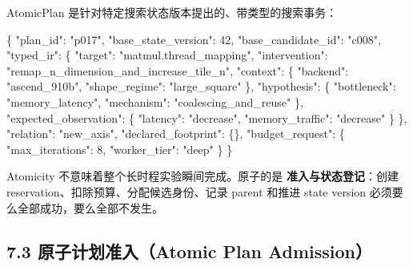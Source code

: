 \documentclass[
  11pt]{ctexart}
\newenvironment{Shaded}{}{}
\newcommand{\DataTypeTok}[1]{\textcolor[rgb]{0.56,0.13,0.00}{#1}}
\newcommand{\DecValTok}[1]{\textcolor[rgb]{0.25,0.63,0.44}{#1}}
\newcommand{\FunctionTok}[1]{\textcolor[rgb]{0.02,0.16,0.49}{#1}}
\newcommand{\StringTok}[1]{\textcolor[rgb]{0.25,0.44,0.63}{#1}}
\begin{document}
AtomicPlan 是针对特定搜索状态版本提出的、带类型的搜索事务：

\begin{Shaded}
\begin{Highlighting}[]
\FunctionTok{\{}
  \DataTypeTok{"plan\_id"}\FunctionTok{:} \StringTok{"p017"}\FunctionTok{,}
  \DataTypeTok{"base\_state\_version"}\FunctionTok{:} \DecValTok{42}\FunctionTok{,}
  \DataTypeTok{"base\_candidate\_id"}\FunctionTok{:} \StringTok{"c008"}\FunctionTok{,}
  \DataTypeTok{"typed\_ir"}\FunctionTok{:} \FunctionTok{\{}
    \DataTypeTok{"target"}\FunctionTok{:} \StringTok{"matmul.thread\_mapping"}\FunctionTok{,}
    \DataTypeTok{"intervention"}\FunctionTok{:} \StringTok{"remap\_n\_dimension\_and\_increase\_tile\_n"}\FunctionTok{,}
    \DataTypeTok{"context"}\FunctionTok{:} \FunctionTok{\{}
      \DataTypeTok{"backend"}\FunctionTok{:} \StringTok{"ascend\_910b"}\FunctionTok{,}
      \DataTypeTok{"shape\_regime"}\FunctionTok{:} \StringTok{"large\_square"}
    \FunctionTok{\},}
    \DataTypeTok{"hypothesis"}\FunctionTok{:} \FunctionTok{\{}
      \DataTypeTok{"bottleneck"}\FunctionTok{:} \StringTok{"memory\_latency"}\FunctionTok{,}
      \DataTypeTok{"mechanism"}\FunctionTok{:} \StringTok{"coalescing\_and\_reuse"}
    \FunctionTok{\},}
    \DataTypeTok{"expected\_observation"}\FunctionTok{:} \FunctionTok{\{}
      \DataTypeTok{"latency"}\FunctionTok{:} \StringTok{"decrease"}\FunctionTok{,}
      \DataTypeTok{"memory\_traffic"}\FunctionTok{:} \StringTok{"decrease"}
    \FunctionTok{\}}
  \FunctionTok{\},}
  \DataTypeTok{"relation"}\FunctionTok{:} \StringTok{"new\_axis"}\FunctionTok{,}
  \DataTypeTok{"declared\_footprint"}\FunctionTok{:} \FunctionTok{\{\},}
  \DataTypeTok{"budget\_request"}\FunctionTok{:} \FunctionTok{\{}
    \DataTypeTok{"max\_iterations"}\FunctionTok{:} \DecValTok{8}\FunctionTok{,}
    \DataTypeTok{"worker\_tier"}\FunctionTok{:} \StringTok{"deep"}
  \FunctionTok{\}}
\FunctionTok{\}}
\end{Highlighting}
\end{Shaded}

Atomicity 不意味着整个长时程实验瞬间完成。原子的是
\textbf{准入与状态登记}：创建 reservation、扣除预算、分配候选身份、记录
parent 和推进 state version 必须要么全部成功，要么全部不发生。

\subsection{7.3 原子计划准入（Atomic Plan
Admission）}\label{ux539fux5b50ux8ba1ux5212ux51c6ux5165atomic-plan-admission}
\end{document}
